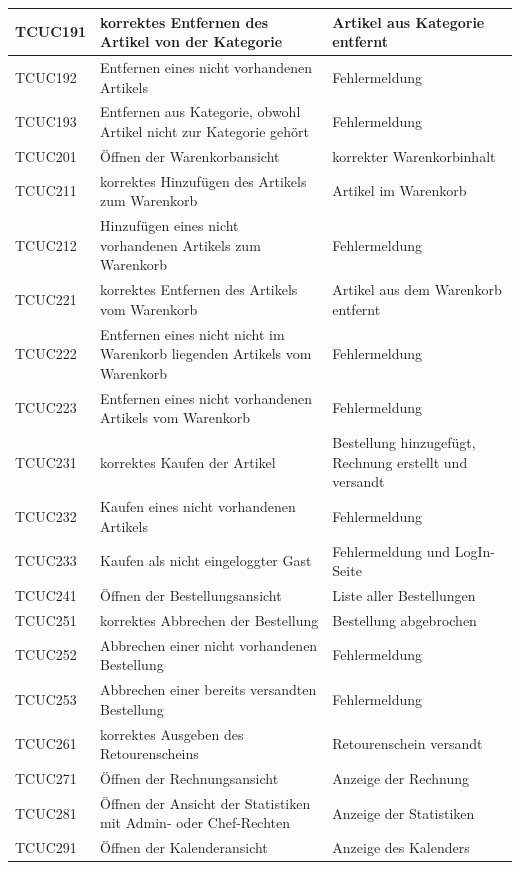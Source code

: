 \documentclass[a4paper]{article}
\begin{document}
\begin{longtable}{|p{50px}|p{200px}|p{100px}|}
	TCUC191 & korrektes Entfernen des Artikel von der Kategorie & Artikel aus Kategorie entfernt \\ \hline
	TCUC192 & Entfernen eines nicht vorhandenen Artikels & Fehlermeldung \\ \hline
	TCUC193 & Entfernen aus Kategorie, obwohl Artikel nicht zur Kategorie gehört & Fehlermeldung \\ \hline
	TCUC201 & Öffnen der Warenkorbansicht & korrekter Warenkorbinhalt \\ \hline
	TCUC211 & korrektes Hinzufügen des Artikels zum Warenkorb & Artikel im Warenkorb \\ \hline
	TCUC212 & Hinzufügen eines nicht vorhandenen Artikels zum Warenkorb & Fehlermeldung \\ \hline
	TCUC221 & korrektes Entfernen des Artikels vom Warenkorb & Artikel aus dem Warenkorb entfernt \\ \hline
	TCUC222 & Entfernen eines nicht nicht im Warenkorb liegenden Artikels vom Warenkorb & Fehlermeldung \\ \hline
	TCUC223 & Entfernen eines nicht vorhandenen Artikels vom Warenkorb & Fehlermeldung \\ \hline
	TCUC231 & korrektes Kaufen der Artikel & Bestellung hinzugefügt, Rechnung erstellt und versandt \\ \hline
	TCUC232 & Kaufen eines nicht vorhandenen Artikels & Fehlermeldung \\ \hline
	TCUC233 & Kaufen als nicht eingeloggter Gast & Fehlermeldung und LogIn-Seite \\ \hline
	TCUC241 & Öffnen der Bestellungsansicht & Liste aller Bestellungen \\ \hline
	TCUC251 & korrektes Abbrechen der Bestellung & Bestellung abgebrochen \\ \hline
	TCUC252 & Abbrechen einer nicht vorhandenen Bestellung & Fehlermeldung \\ \hline	
	TCUC253 & Abbrechen einer bereits versandten Bestellung & Fehlermeldung \\ \hline
	TCUC261 & korrektes Ausgeben des Retourenscheins  & Retourenschein versandt \\ \hline
	TCUC271 & Öffnen der Rechnungsansicht & Anzeige der Rechnung \\ \hline	
	TCUC281 & Öffnen der Ansicht der Statistiken mit Admin- oder Chef-Rechten & Anzeige der Statistiken \\ \hline
	TCUC291 & Öffnen der Kalenderansicht & Anzeige des Kalenders \\ \hline

\end{longtable}
\end{document}
